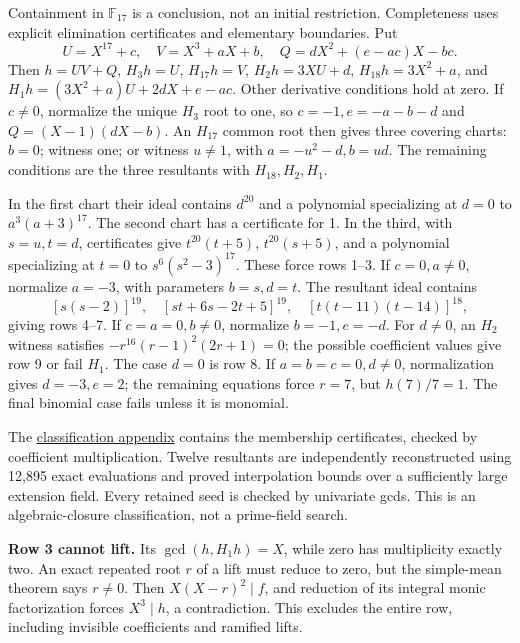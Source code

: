 \documentclass[
  british,
  10pt,
]{article}
\begin{document}
Containment in \(\mathbb F_{17}\) is a conclusion, not an initial
restriction. Completeness uses explicit elimination certificates and
elementary boundaries. Put \[
 U=X^{17}+c,\quad V=X^3+aX+b,\quad
 Q=dX^2+(e-ac)X-bc.
\] Then \(h=UV+Q\), \(H_3h=U\), \(H_{17}h=V\), \(H_2h=3XU+d\),
\(H_{18}h=3X^2+a\), and \(H_1h=(3X^2+a)U+2dX+e-ac\). Other derivative
conditions hold at zero. If \(c\ne0\), normalize the unique \(H_3\) root
to one, so \(c=-1,e=-a-b-d\) and \(Q=(X-1)(dX-b)\). An \(H_{17}\) common
root then gives three covering charts: \(b=0\); witness one; or witness
\(u\ne1\), with \(a=-u^2-d,b=ud\). The remaining conditions are the
three resultants with \(H_{18},H_2,H_1\).

In the first chart their ideal contains \(d^{20}\) and a polynomial
specializing at \(d=0\) to \(a^3(a+3)^{17}\). The second chart has a
certificate for 1. In the third, with \(s=u,t=d\), certificates give
\(t^{20}(t+5)\), \(t^{20}(s+5)\), and a polynomial specializing at
\(t=0\) to \(s^6(s^2-3)^{17}\). These force rows 1--3. If \(c=0,a\ne0\),
normalize \(a=-3\), with parameters \(b=s,d=t\). The resultant ideal
contains \[
 [s(s-2)]^{19},\quad[st+6s-2t+5]^{19},\quad
 [t(t-11)(t-14)]^{18},
\] giving rows 4--7. If \(c=a=0,b\ne0\), normalize \(b=-1,e=-d\). For
\(d\ne0\), an \(H_2\) witness satisfies \(-r^{16}(r-1)^2(2r+1)=0\); the
possible coefficient values give row 9 or fail \(H_1\). The case \(d=0\)
is row 8. If \(a=b=c=0,d\ne0\), normalization gives \(d=-3,e=2\); the
remaining equations force \(r=7\), but \(h(7)/7=1\). The final binomial
case fails unless it is monomial.

The
\href{evidence/full/support_frontier/prime17/CLASSIFICATION.md}{classification
appendix} contains the membership certificates, checked by coefficient
multiplication. Twelve resultants are independently reconstructed using
12,895 exact evaluations and proved interpolation bounds over a
sufficiently large extension field. Every retained seed is checked by
univariate gcds. This is an algebraic-closure classification, not a
prime-field search.

\textbf{Row 3 cannot lift.} Its \(\gcd(h,H_1h)=X\), while zero has
multiplicity exactly two. An exact repeated root \(r\) of a lift must
reduce to zero, but the simple-mean theorem says \(r\ne0\). Then
\(X(X-r)^2\mid f\), and reduction of its integral monic factorization
forces \(X^3\mid h\), a contradiction. This excludes the entire row,
including invisible coefficients and ramified lifts.
\end{document}
